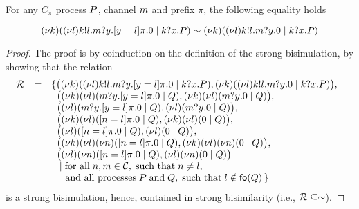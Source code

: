 \begin{proposition}\label{prop:behavioural}
For any $C_\pi$ process $P$, channel $m$ and prefix $\pi$, the following equality holds

\[
(\nu k)
( (\nu l)k!l.m?y.[ y = l ]\pi.0 \;|\; k?x.P)
\sim 
(\nu k)
( (\nu l)k!l.m?y.0 \;|\; k?x.P)
\]

\end{proposition}
%
\begin{proof}
The proof is by coinduction on the definition of the strong bisimulation, by showing that the relation 
\[
\begin{array}[t]{@{}rcl@{\;\;}l@{}}
{\cal R} & =  & \{ \big(
\rest\NK
( \rest\NL\send\NK\role\msg\NL.\receive\NM\role\msg\NY.\match\NY\role\msg\NL\pi.\inact \parop \receive\NK\role\msg\NX.\PP), 
\rest\NK
( \rest\NL\send\NK\role\msg\NL.\receive\NM\role\msg\NY.\inact \parop \receive\NK\role\msg\NX.\PP)
\big),  \\
          &   & \;\; \big(
\rest\NK\rest\NL
( \receive\NM\role\msg\NY.\match\NY\role\msg\NL\pi.\inact \parop \PQ), 
\rest\NK \rest\NL
( \receive\NM\role\msg\NY.\inact \parop \PQ)
\big), \\
          &   & \;\; \big(
\rest\NL
( \receive\NM\role\msg\NY.\match\NY\role\msg\NL\pi.\inact \parop \PQ), 
 \rest\NL
( \receive\NM\role\msg\NY.\inact \parop \PQ)
\big), \\
          &   & \;\; \big(
\rest\NK \rest\NL
( \match\NN\role\msg\NL\pi.\inact \parop \PQ), 
\rest\NK \rest\NL
(\inact \parop \PQ)
\big), \\
          &   & \;\; \big(
\rest\NL
( \match\NN\role\msg\NL\pi.\inact \parop \PQ), 
 \rest\NL
 (\inact \parop \PQ)
\big),\\
          &   & \;\; \big(
\rest\NK \rest\NL \rest\NN
( \match\NN\role\msg\NL\pi.\inact \parop \PQ), 
\rest\NK \rest\NL \rest\NN
(\inact \parop \PQ)
\big), \\
          &   & \;\; \big(
\rest\NL \rest\NN
( \match\NN\role\msg\NL\pi.\inact \parop \PQ), 
 \rest\NL \rest\NN
 (\inact \parop \PQ)
\big) \\
&   & \;\;\parop \mbox{for all}\; \NN,\NM\in\Chn, \; \mbox{such that} \; \NN\not=\NL, \\
&   & \;\;\;\;\hbox{ and all processes}\; \PP \; \mbox{and} \;  \PQ, \; \hbox{such that} \; \NL\notin\fo\PQ\,\}
\end{array}
\]
is a strong bisimulation, hence, contained in strong bisimilarity (i.e., ${\cal R}\subseteq \sim$).


\end{proof}
